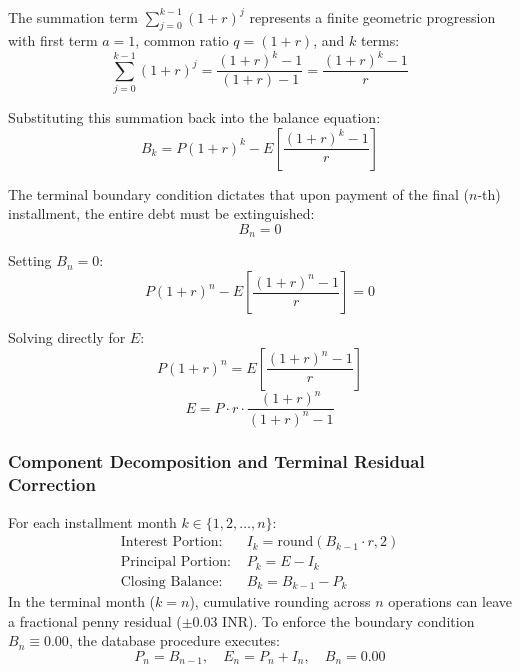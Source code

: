 \documentclass[11pt,a4paper]{report}
\begin{document}
The summation term $\sum_{j=0}^{k-1} (1+r)^j$ represents a finite geometric progression with first term $a=1$, common ratio $q = (1+r)$, and $k$ terms:
\begin{equation}
    \sum_{j=0}^{k-1} (1+r)^j = \frac{(1+r)^k - 1}{(1+r) - 1} = \frac{(1+r)^k - 1}{r}
\end{equation}

Substituting this summation back into the balance equation:
\begin{equation}
    B_k = P(1+r)^k - E \left[ \frac{(1+r)^k - 1}{r} \right]
\end{equation}

The terminal boundary condition dictates that upon payment of the final ($n$-th) installment, the entire debt must be extinguished:
\begin{equation}
    B_n = 0
\end{equation}

Setting $B_n = 0$:
\begin{equation}
    P(1+r)^n - E \left[ \frac{(1+r)^n - 1}{r} \right] = 0
\end{equation}

Solving directly for $E$:
\begin{equation}
    P(1+r)^n = E \left[ \frac{(1+r)^n - 1}{r} \right]
\end{equation}
\begin{equation}
    \boxed{E = P \cdot r \cdot \frac{(1+r)^n}{(1+r)^n - 1}}
    \label{eq:emi_final}
\end{equation}

\subsubsection{Component Decomposition and Terminal Residual Correction}
For each installment month $k \in \{1, 2, \dots, n\}$:
\begin{align}
    \text{Interest Portion: } & I_k = \text{round}\left(B_{k-1} \cdot r, 2\right) \\
    \text{Principal Portion: } & P_k = E - I_k \\
    \text{Closing Balance: } & B_k = B_{k-1} - P_k
\end{align}
In the terminal month ($k=n$), cumulative rounding across $n$ operations can leave a fractional penny residual ($\pm 0.03$ INR). To enforce the boundary condition $B_n \equiv 0.00$, the database procedure executes:
\begin{equation}
    P_n = B_{n-1}, \quad E_n = P_n + I_n, \quad B_n = 0.00
\end{equation}
\end{document}
